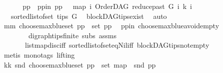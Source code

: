 \begin{isabellebody}
%
\isadelimproof
%
\endisadelimproof
%
\isatagproof
{}\isamarkupfalse%
\ {\isacharminus}{\kern0pt}\ \isanewline
\ \ \isamarkupfalse%
\ pp\ \ pp{\isacharunderscore}{\kern0pt}in{\isacharcolon}{\kern0pt}\ {\isachardoublequoteopen}pp\ {\isacharequal}{\kern0pt}\ \ {\isacharparenleft}{\kern0pt}map\ {\isacharparenleft}{\kern0pt}{\isasymlambda}i{\isachardot}{\kern0pt}\ {\isacharparenleft}{\kern0pt}OrderDAG\ {\isacharparenleft}{\kern0pt}reduce{\isacharunderscore}{\kern0pt}past\ G\ i{\isacharparenright}{\kern0pt}\ k{\isacharcomma}{\kern0pt}\ i{\isacharparenright}{\kern0pt}{\isacharparenright}{\kern0pt}\isanewline
\ \ \ {\isacharparenleft}{\kern0pt}sorted{\isacharunderscore}{\kern0pt}list{\isacharunderscore}{\kern0pt}of{\isacharunderscore}{\kern0pt}set\ {\isacharparenleft}{\kern0pt}tips\ G{\isacharparenright}{\kern0pt}{\isacharparenright}{\kern0pt}{\isacharparenright}{\kern0pt}{\isachardoublequoteclose}\ \isamarkupfalse%
\ blockDAG{\isachardot}{\kern0pt}tips{\isacharunderscore}{\kern0pt}exist\ \isamarkupfalse%
\ auto\isanewline
\ \ \ \ \isamarkupfalse%
\ mm{\isacharcolon}{\kern0pt}\ {\isachardoublequoteopen}choose{\isacharunderscore}{\kern0pt}max{\isacharunderscore}{\kern0pt}blue{\isacharunderscore}{\kern0pt}set\ pp\ {\isasymin}\ set\ pp{\isachardoublequoteclose}\ \isamarkupfalse%
\ pp{\isacharunderscore}{\kern0pt}in\ choose{\isacharunderscore}{\kern0pt}max{\isacharunderscore}{\kern0pt}blue{\isacharunderscore}{\kern0pt}avoid{\isacharunderscore}{\kern0pt}empty\isanewline
\ \ \ \ \ \ \ \ digraph{\isachardot}{\kern0pt}tips{\isacharunderscore}{\kern0pt}finite\ subs\ assms{\isacharparenleft}{\kern0pt}{}{\isacharparenright}{\kern0pt}\isanewline
\ \ \ \ \ \ \ list{\isachardot}{\kern0pt}map{\isacharunderscore}{\kern0pt}disc{\isacharunderscore}{\kern0pt}iff\ sorted{\isacharunderscore}{\kern0pt}list{\isacharunderscore}{\kern0pt}of{\isacharunderscore}{\kern0pt}set{\isacharunderscore}{\kern0pt}eq{\isacharunderscore}{\kern0pt}Nil{\isacharunderscore}{\kern0pt}iff\ blockDAG{\isachardot}{\kern0pt}tips{\isacharunderscore}{\kern0pt}not{\isacharunderscore}{\kern0pt}empty\ \isanewline
\ \ \ \ \ \ \isamarkupfalse%
\ {\isacharparenleft}{\kern0pt}metis\ {\isacharparenleft}{\kern0pt}mono{\isacharunderscore}{\kern0pt}tags{\isacharcomma}{\kern0pt}\ lifting{\isacharparenright}{\kern0pt}{\isacharparenright}{\kern0pt}\ \ \isanewline
\ \ \ \ \isamarkupfalse%
\ \isamarkupfalse%
\ kk{\isacharcolon}{\kern0pt}\ {\isachardoublequoteopen}snd\ {\isacharparenleft}{\kern0pt}choose{\isacharunderscore}{\kern0pt}max{\isacharunderscore}{\kern0pt}blue{\isacharunderscore}{\kern0pt}set\ pp{\isacharparenright}{\kern0pt}\ {\isasymin}\ set\ {\isacharparenleft}{\kern0pt}map\ \ snd\ pp{\isacharparenright}{\kern0pt}{\isachardoublequoteclose}\isanewline

\end{isabellebody}
